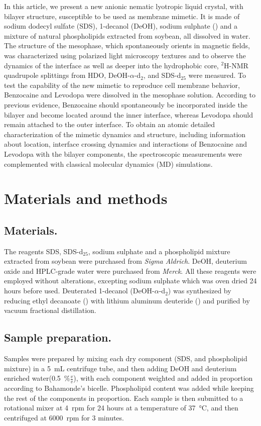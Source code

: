 \documentclass[3p,preprint,review]{elsarticle}
\begin{document}
	In this article, we present a new anionic nematic lyotropic liquid crystal,
	with bilayer structure, susceptible to be used as membrane mimetic. It is made
	of sodium dodecyl sulfate (SDS), 1-decanol (DeOH), sodium sulphate
	()
	and a mixture of natural phospholipids extracted from soybean, all dissolved in
	water. The structure of the mesophase, which spontaneously orients in magnetic
	fields,
	was characterized using polarized light microscopy textures and to observe the
	dynamics
	of the interface as well as deeper into the hydrophobic core, $^2$H-NMR
	quadrupole splittings from HDO, DeOH-$\alpha$-d$_2$, and SDS-d$_{25}$ were
	measured. To test the capability of the new mimetic to reproduce
	cell membrane behavior, Benzocaine and Levodopa were dissolved in the mesophase
	solution. According to previous evidence, Benzocaine should spontaneously be
	incorporated inside the bilayer and become located around the inner
	interface\cite{Martin2014a},
	whereas Levodopa should remain attached to the outer
	interface\cite{Orowski2012}. 
	To obtain an atomic detailed characterization of the mimetic dynamics and
	structure, including information about location, interface crossing dynamics
	and
	interactions of Benzocaine and Levodopa with the bilayer components, the
	spectroscopic measurements were complemented with classical molecular dynamics
	(MD) simulations.
	
	\section{Materials and methods}
	\subsection{Materials.}
	The reagents SDS, SDS-d$_{25}$, sodium sulphate and a phospholipid mixture
	extracted from soybean were purchased from \textit{Sigma Aldrich}. DeOH,
	deuterium oxide and HPLC-grade water were purchased from \textit{Merck}. All
	these reagents were employed without alterations, excepting sodium sulphate
	which was oven dried 24 hours before used. Deuterated 1-decanol
	(DeOH-$\alpha$-d$_2$) was synthesized by reducing ethyl decanoate
	() with lithium aluminum deuteride () and
	purified by vacuum fractional distillation.\\
	\subsection{Sample preparation.}
	Samples were prepared by mixing each dry component (SDS,  and
	phospholipid mixture) in a \SI{5}{mL} centrifuge tube, and then adding DeOH and
	deuterium enriched water(\SI{0.5}{\percent}$\tfrac{v}{v}$), with each
	component
	weighted and added in proportion according to Bahamonde's
	bicelle\cite{Bahamonde-Padilla2013}. Phospholipid content was added while
	keeping the rest of the components in
	proportion. Each sample is then submitted to a
	rotational mixer at \SI{4}{rpm} for 24 hours at a temperature of
	\SI{37}{\celsius}, and then centrifuged at \SI{6000}{rpm} for 3 minutes.
	
\end{document}
